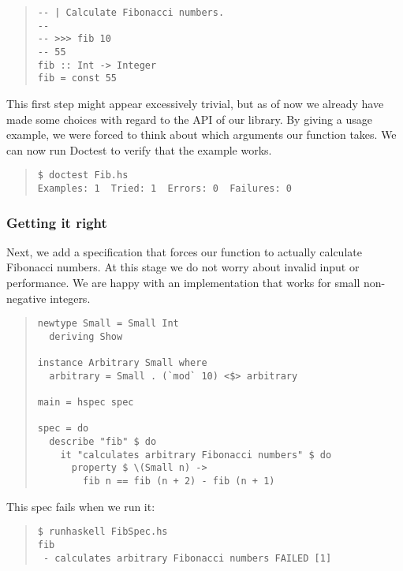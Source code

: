 \documentclass[preprint]{sigplanconf}
\begin{document}
\begin{quote}
\small
\begin{verbatim}
-- | Calculate Fibonacci numbers.
--
-- >>> fib 10
-- 55
fib :: Int -> Integer
fib = const 55
\end{verbatim}
\end{quote}

\noindent This first step might appear excessively trivial, but as of now we
already have made some choices with regard to the API of our library.
By giving a usage example, we were forced to think about which
arguments our function takes.  We can now run Doctest to verify that
the example works.

\begin{quote}
\small
\begin{verbatim}
$ doctest Fib.hs
Examples: 1  Tried: 1  Errors: 0  Failures: 0
\end{verbatim}
\end{quote}


\subsubsection{Getting it right}

Next, we add a specification that forces our function to actually
calculate Fibonacci numbers.
At this stage we do not worry about invalid input or performance.  We
are happy with an implementation that works for small non-negative
integers.

\begin{quote}
\small
\begin{verbatim}
newtype Small = Small Int
  deriving Show

instance Arbitrary Small where
  arbitrary = Small . (`mod` 10) <$> arbitrary

main = hspec spec

spec = do
  describe "fib" $ do
    it "calculates arbitrary Fibonacci numbers" $ do
      property $ \(Small n) ->
        fib n == fib (n + 2) - fib (n + 1)
\end{verbatim}
\end{quote}

\noindent This spec fails when we run it:

\begin{quote}
\small
\begin{verbatim}
$ runhaskell FibSpec.hs
fib
 - calculates arbitrary Fibonacci numbers FAILED [1]
\end{verbatim}
\end{quote}
\end{document}
